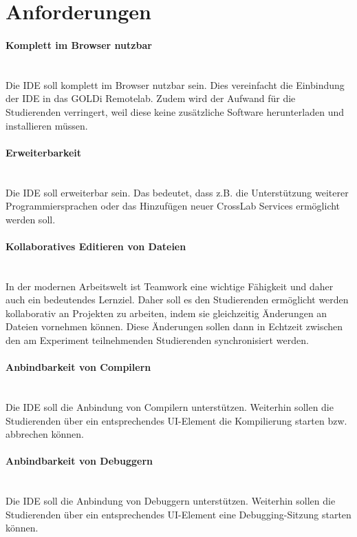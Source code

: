 \section{Anforderungen}\label{section:anforderungsanalyse:anforderungen}

\paragraph{Komplett im Browser nutzbar} \mbox{} \\
Die IDE soll komplett im Browser nutzbar sein. Dies vereinfacht die Einbindung der IDE in das GOLDi Remotelab. Zudem wird der Aufwand für die Studierenden verringert, weil diese keine zusätzliche Software herunterladen und installieren müssen.

\paragraph{Erweiterbarkeit} \mbox{} \\
Die IDE soll erweiterbar sein. Das bedeutet, dass z.B. die Unterstützung weiterer Programmiersprachen oder das Hinzufügen neuer CrossLab Services ermöglicht werden soll.

\paragraph{Kollaboratives Editieren von Dateien} \mbox{} \\
In der modernen Arbeitswelt ist Teamwork eine wichtige Fähigkeit und daher auch ein bedeutendes Lernziel. Daher soll es den Studierenden ermöglicht werden kollaborativ an Projekten zu arbeiten, indem sie gleichzeitig Änderungen an Dateien vornehmen können. Diese Änderungen sollen dann in Echtzeit zwischen den am Experiment teilnehmenden Studierenden synchronisiert werden.

\paragraph{Anbindbarkeit von Compilern} \mbox{} \\
Die IDE soll die Anbindung von Compilern unterstützen. Weiterhin sollen die Studierenden über ein entsprechendes UI-Element die Kompilierung starten bzw. abbrechen können.

\paragraph{Anbindbarkeit von Debuggern} \mbox{} \\
Die IDE soll die Anbindung von Debuggern unterstützen. Weiterhin sollen die Studierenden über ein entsprechendes UI-Element eine Debugging-Sitzung starten können.

